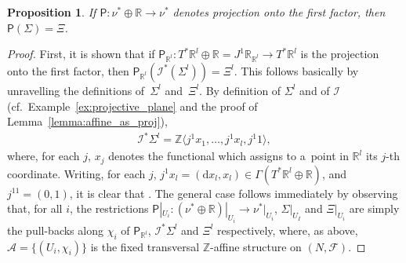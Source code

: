 \documentclass[10pt,a4paper]{amsart}
\numberwithin{equation}{section}
\newtheorem{Proposition}[Theorem]{Proposition}
\newcommand{\de}{\mathrm{d}} %
\newcommand{\RR}{\mathbb{R}}
\newcommand{\ZZ}{\mathbb{Z}}
\begin{document}
\begin{Proposition}\label{prop:sigma_proj_xi}
If $\mathsf{P} \colon \nu^* \oplus \RR \to \nu^*$ denotes projection onto the first factor, then $\mathsf{P}(\Sigma) = \Xi$.
\end{Proposition}
\begin{proof}
First, it is shown that if $\mathsf{P}_{\RR^l} \colon T^* \RR^l \oplus \RR =J^1\RR_{\RR^l} \to T^*\RR^l$ is the projection onto the f\/irst factor, then
 $\mathsf{P}_{\RR^l}(\mathcal{I}^*(\Sigma^l)) = \Xi^l$. This follows basically by unravelling the def\/initions of~$\Sigma^l$ and~$\Xi^l$. By def\/inition of $\Sigma^l$ and of $\mathcal{I}$ (cf.\ Example~\ref{ex:projective_plane} and the proof of Lemma~\ref{lemma:affine_as_proj}),
 \begin{gather*}
 \mathcal{I}^*\Sigma^l= \ZZ\big \langle j^1x_1,\ldots,j^1x_l, j^1 1\big\rangle,
 \end{gather*}
where, for each $j$, $x_j$ denotes the functional which assigns to a~point in $\RR^l$ its $j$-th coordinate. Writing, for each $j$, $j^1x_l = (\de x_l,x_l) \in \Gamma(T^* \RR^l \oplus \RR)$, and $j^11=(0,1)$, it is clear that \smash{$\mathsf{P}_{\RR^l}(\mathcal{I}^*(\Sigma^l))= \Xi^l$}. The general case follows immediately by observing that, for all $i$, the restrictions $\mathsf{P}|_{U_i} \colon (\nu^* \oplus \RR)|_{U_i} \to \nu^*|_{U_i}$, $\Sigma|_{U_I}$ and $\Xi|_{U_i}$ are simply the pull-backs along $\chi_i$ of $\mathsf{P}_{\RR^l}$, $\mathcal{I}^* \Sigma^l$ and $\Xi^l$ respectively, where, as above, $\mathcal{A} = \{(U_i,\chi_i)\}$ is the f\/ixed transversal $\ZZ$-af\/f\/ine structure on $(N,\mathcal{F})$.
\end{proof}
\end{document}
